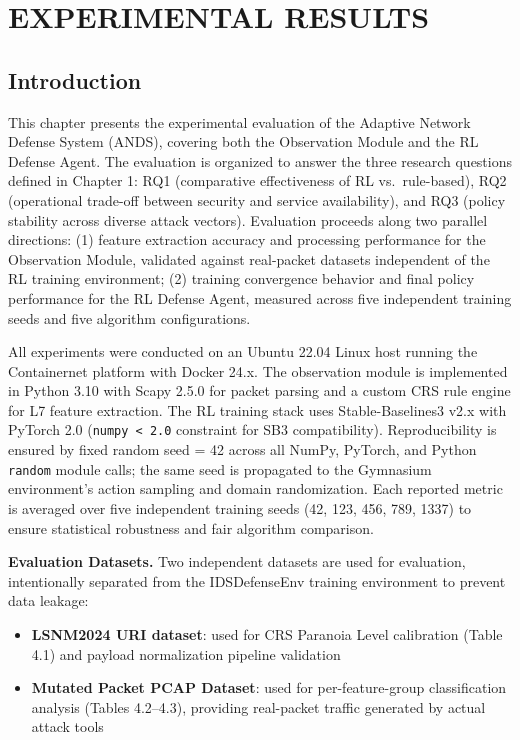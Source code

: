 \documentclass[12pt,a4paper]{report}
\begin{document}
\chapter{EXPERIMENTAL RESULTS}

\section{Introduction}

This chapter presents the experimental evaluation of the Adaptive Network Defense System (ANDS), covering both the Observation Module and the RL Defense Agent. The evaluation is organized to answer the three research questions defined in Chapter 1: RQ1 (comparative effectiveness of RL vs.\ rule-based), RQ2 (operational trade-off between security and service availability), and RQ3 (policy stability across diverse attack vectors). Evaluation proceeds along two parallel directions: (1) feature extraction accuracy and processing performance for the Observation Module, validated against real-packet datasets independent of the RL training environment; (2) training convergence behavior and final policy performance for the RL Defense Agent, measured across five independent training seeds and five algorithm configurations.

All experiments were conducted on an Ubuntu 22.04 Linux host running the Containernet platform with Docker 24.x. The observation module is implemented in Python 3.10 with Scapy 2.5.0 for packet parsing and a custom CRS rule engine for L7 feature extraction. The RL training stack uses Stable-Baselines3 v2.x with PyTorch 2.0 (\texttt{numpy < 2.0} constraint for SB3 compatibility). Reproducibility is ensured by fixed random seed = 42 across all NumPy, PyTorch, and Python \texttt{random} module calls; the same seed is propagated to the Gymnasium environment's action sampling and domain randomization. Each reported metric is averaged over five independent training seeds (42, 123, 456, 789, 1337) to ensure statistical robustness and fair algorithm comparison.

\textbf{Evaluation Datasets.} Two independent datasets are used for evaluation, intentionally separated from the IDSDefenseEnv training environment to prevent data leakage:
\begin{itemize}
  \item \textbf{LSNM2024 URI dataset}: used for CRS Paranoia Level calibration (Table 4.1) and payload normalization pipeline validation
  \item \textbf{Mutated Packet PCAP Dataset}: used for per-feature-group classification analysis (Tables 4.2--4.3), providing real-packet traffic generated by actual attack tools
\end{itemize}
\end{document}
